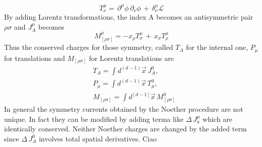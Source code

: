 \documentclass[a4paper,10pt]{article}
\begin{document}
\begin{equation}
 T^\mu_\nu=\, \partial^\mu\phi\,\partial_\nu\phi\,+\,\delta^\mu_\nu\mathcal{L}
\end{equation}
By adding Lorentz transformations, the index A becomes an antisymmetric pair $\rho\sigma$
and $J^\mu_A$ becomes
\begin{equation}
 M^\mu_{[\rho \sigma]}=-x_\rho T^\mu_\sigma \, + \, x_\sigma T^\mu_\rho
\end{equation}
Thus the conserved charges for those symmetry, called $T_A$ for the internal one, $P_\mu$ for translations and $M_{[\rho \sigma]}$ for Lorentz translations are
\begin{equation}
 \begin{align}
  &T_A=\int{d^{(d-1)}\overrightarrow{x}\,J^0_A},\\
  &P_\mu=\int{d^{(d-1)}\overrightarrow{x}\,T^0_\mu},\\
  &M_{[\rho \sigma]}=\int{d^{[d-1]}\overrightarrow{x}\,M^0_{[\rho \sigma]}}
 \end{align}
\end{equation}
In general the symmetry currents obtained by the Noether procedure are not unique.
In fact they can be modified by adding terma like $\Delta\,J^\mu_a$ which are identically conserved.
Neither Noether charges are changed by the added term since $\Delta\,J^0_A$ involves total spatial derivatives.
Ciao
\end{document}
